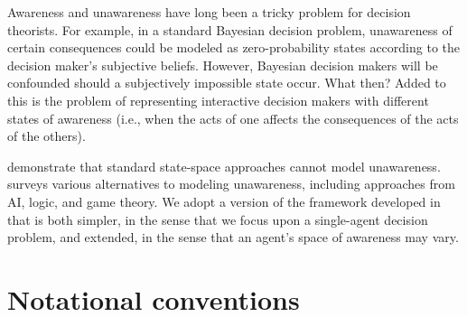 \documentclass[
11pt,
titlepage,
reqno,
]{article}%
\theoremstyle{definition}
\begin{document}
	Awareness and unawareness have long been a tricky problem for decision theorists. 
	For example, in a standard Bayesian decision problem, unawareness of certain consequences could be modeled as zero-probability states according to the decision maker's subjective beliefs. 
	However, Bayesian decision makers will be confounded should a subjectively impossible state occur. 
	What then?
	Added to this is the problem of representing interactive decision makers with different states of awareness (i.e., when the acts of one affects the consequences of the acts of the others). 
	
	\citet{Dekel1998} demonstrate that standard state-space approaches cannot model unawareness. 
	\citet{Schipper2015} surveys various alternatives to modeling unawareness, including approaches from  AI, logic, and game theory. 
	We adopt a version of the framework developed in \citet{Heifetz2006} \citep[also see][for related extensions]{Heifetz2008,Heifetz2013} that is both simpler, in the sense that we focus upon a single-agent decision problem, and extended, in the sense that an agent's space of awareness may vary.
	
	
	\section{Notational conventions}
\end{document}
